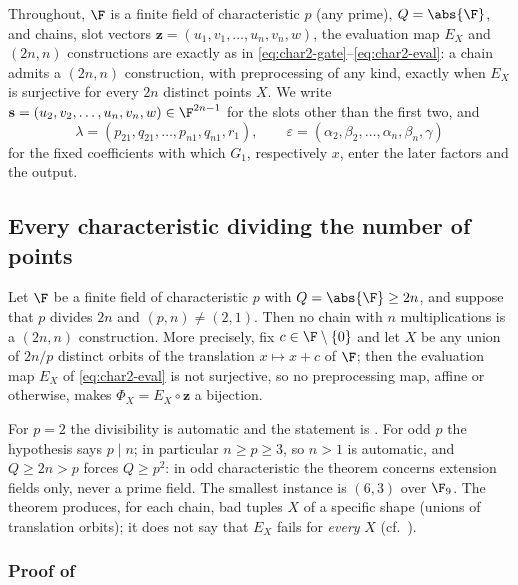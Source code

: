 Throughout, $\F$ is a finite field of characteristic $p$ (any prime), $Q=\abs{\F}$, and
chains, slot vectors $\mathbf z=(u_1,v_1,\dots,u_n,v_n,w)$, the evaluation map $E_X$ and
$(2n,n)$ constructions are exactly as in \eqref{eq:char2-gate}--\eqref{eq:char2-eval}: a
chain admits a $(2n,n)$ construction, with preprocessing of any kind, exactly when $E_X$
is surjective for every $2n$ distinct points $X$.  We write
$\mathbf s=(u_2,v_2,\dots,u_n,v_n,w)\in\F^{2n-1}$ for the slots other than the first two,
and
\begin{equation}
   \lambda=(p_{21},q_{21},\dots,p_{n1},q_{n1},r_1),
   \qquad
   \varepsilon=(\alpha_2,\beta_2,\dots,\alpha_n,\beta_n,\gamma)
   \label{eq:charp-lambda-eps}
\end{equation}
for the fixed coefficients with which $G_1$, respectively $x$, enter the later factors and
the output.

\subsection{Every characteristic dividing the number of points}
\label{sec:charp-divides}

\begin{theorem}
\label{thm:charp-lower}
Let $\F$ be a finite field of characteristic $p$ with $Q=\abs{\F}\ge 2n$, and suppose
that $p$ divides $2n$ and $(p,n)\neq(2,1)$.  Then no chain with $n$ multiplications is a
$(2n,n)$ construction.  More precisely, fix $c\in\F\setminus\{0\}$ and let $X$ be any
union of $2n/p$ distinct orbits of the translation $x\mapsto x+c$ of $\F$; then the
evaluation map $E_X$ of \eqref{eq:char2-eval} is not surjective, so no preprocessing map,
affine or otherwise, makes $\Phi_X=E_X\circ\mathbf z$ a bijection.
\end{theorem}

For $p=2$ the divisibility is automatic and the statement is .  For
odd $p$ the hypothesis says $p\mid n$; in particular $n\ge p\ge3$, so $n>1$ is automatic,
and $Q\ge 2n>p$ forces $Q\ge p^2$: in odd characteristic the theorem concerns extension
fields only, never a prime field.  The smallest instance is $(6,3)$ over $\F_9$.  The
theorem produces, for each chain, bad tuples $X$ of a specific shape (unions of
translation orbits); it does not say that $E_X$ fails for \emph{every} $X$
(cf.\ ).

\subsubsection*{Proof of }


